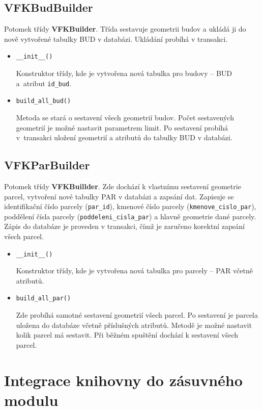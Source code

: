\subsection{VFKBudBuilder}
Potomek třídy \textbf{VFKBuilder}. Třída sestavuje geometrii budov a
ukládá ji do nově vytvořené tabulky BUD v databázi. Ukládání probíhá v
transakci.
\begin{itemize}[leftmargin=50pt]
\item \verb|__init__()|

Konstruktor třídy, kde je vytvořena nová tabulka pro budovy -- BUD a~atribut \verb|id_bud|.
\item \verb|build_all_bud()|

  Metoda se stará o sestavení všech geometrií budov. Počet sestavených
  geometrií je možné nastavit parametrem limit. Po sestavení probíhá
  v~tran\-sakci uložení geo\-metrií a atributů do tabulky BUD v
  databázi.
\end{itemize}
\subsection{VFKParBuilder}
Potomek třídy \textbf{VFKBuillder}. Zde dochází k vlastnímu sestavení
geometrie parcel, vytvoření nové tabulky PAR v databázi a zapsání
dat. Zapisuje se identifikační číslo parcely (\verb|par_id|), kmenové
číslo parcely (\verb|kmenove_cislo_par|), poddělení čísla
parcely (\verb|poddeleni_cisla_par|) a hlavně geometrie dané
parcely. Zápis do databáze je proveden v transakci, čímž je zaručeno
korektní zapsání všech parcel.

\begin{itemize}[leftmargin=50pt]
\item \verb|__init__()|

Konstruktor třídy, kde je vytvořena nová tabulka pro parcely -- PAR včetně atributů.
\item \verb|build_all_par()|

Zde probíhá samotné sestavení geometrií všech parcel. Po sestavení je parcela
uložena do databáze včetně příslušných atributů. Metodě je možné nastavit
kolik parcel má sestavit. Při běžném spuštění dochází k sestavení všech parcel.

\end{itemize}
\section{Integrace knihovny do zásuvného modulu}
\label{sec:integrace_knihovny}

